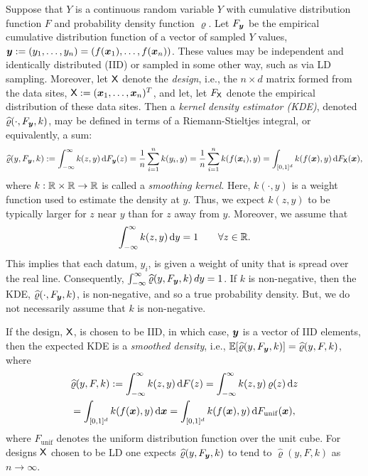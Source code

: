 \documentclass[letterpaper]{amsart}
\newcommand{\hvarrho}{\widehat{\varrho}}
\begin{document}
Suppose that  $Y$ is a continuous random variable $Y$ with cumulative distribution function $F$ and probability density function $\varrho$.  Let $F_{\boldsymbol{y}}$ be the empirical cumulative distribution function of a vector of sampled $Y$ values, $\boldsymbol{y} := (y_1, \ldots, y_n) = (f(\boldsymbol{x}_1), \ldots, f(\boldsymbol{x}_n))$.  These values may be independent and identically distributed (IID) or sampled in some other way, such as via LD sampling.  Moreover, let $\mathsf{X}$ denote the \emph{design}, i.e., the $n \times d$ matrix formed from the data sites, $\mathsf{X}:=(\boldsymbol{x}_1, \ldots, \boldsymbol{x}_n)^T$, and let, let $F_{\mathsf{X}}$ denote the empirical distribution of  these data sites.  Then a \emph{kernel density estimator (KDE)}, denoted $\hvarrho(\cdot,F_{\vy},k)$, may be defined  in terms of a Riemann-Stieltjes integral, or equivalently, a sum:
\begin{equation} \label{eq:kdedef}
	\hvarrho(y,F_{\vy},k) := \int_{-\infty}^{\infty} k(z,y) \, \dif F_{\vy}(z)  = \frac 1n \sum_{i=1}^n k(y_i,y) \\
	= \frac 1n \sum_{i=1}^n k(f(\vx_i),y) = \int_{[0,1]^d} k(f(\vx),y) \, \dif F_\mX(\vx),
\end{equation}
where $k:\mathbb{R} \times \mathbb{R} \to \mathbb{R}$ is called a \emph{smoothing kernel}.  Here, $k(\cdot,y)$ is a weight function used to estimate the density at $y$.  Thus, we expect $k(z,y)$ to be typically larger for $z$ near $y$ than for $z$ away from $y$.   Moreover, we assume that
\begin{equation}
	\label{eq:kintegral}
	\int_{-\infty}^{\infty} k(z,y) \, {\rm d} y = 1 \qquad \forall z \in \mathbb{R}.
\end{equation}
This implies that each datum, $y_i$, is given a weight of unity that is spread over the real line.  Consequently, $\int_{-\infty}^{\infty} \hvarrho(y,F_{\vy},k) \, dy = 1$.  If $k$ is non-negative, then the KDE, $\hvarrho(\cdot,F_{\vy},k)$, is non-negative, and so a true probability density.  But, we do not necessarily assume that $k$ is non-negative.

If the design, $\mathsf{X}$, is chosen to be IID, in which case, $\boldsymbol{y}$ is a vector of IID elements, then the expected KDE is a \emph{smoothed density}, i.e., $\Ex[\hvarrho(y,F_{\vy},k)] = \hvarrho(y,F,k)$, where
\begin{multline}
	\label{eq:smoothdens}
	\hvarrho(y,F,k) := \int_{-\infty}^{\infty} k(z,y) \, \dif F(z)
	= \int_{-\infty}^{\infty} k(z,y) \, \varrho(z) \, \dif z \\
	= \int_{[0,1]^d} k(f(\vx),y) \,  \dif \vx
	= \int_{[0,1]^d} k(f(\vx),y) \,  \dif F_{\mathrm{unif}}(\vx),
\end{multline}
where $F_{\mathrm{unif}}$ denotes the uniform distribution function over the unit cube.
For designs $\mathsf{X}$ chosen to be LD one expects $\hvarrho(y,F_{\vy},k)$ to tend to $\hvarrho(y,F,k)$ as $n \to \infty$.
\end{document}

